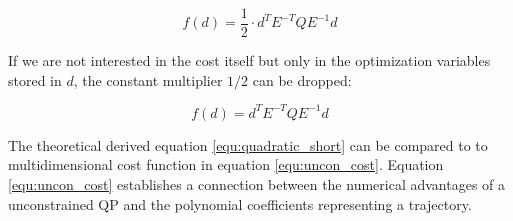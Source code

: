 \begin{equation}
 f(d)  = \frac{1}{2} \cdot d^T  E^{-T}  Q  E^{-1}  d 
\label{equ:quadratic_simple}
\end{equation}

If we are not interested  in the cost itself but only in the optimization variables stored in $d$, the constant multiplier $1/2$ can be dropped:

\begin{equation}
 f(d)  = d^T  E^{-T}  Q  E^{-1}  d 
\label{equ:quadratic_short}
\end{equation}

The theoretical derived equation \ref{equ:quadratic_short} can be compared to to multidimensional cost function in equation \ref{equ:uncon_cost}. Equation \ref{equ:uncon_cost} establishes a connection between the numerical advantages of a unconstrained QP and the polynomial coefficients representing a trajectory.












